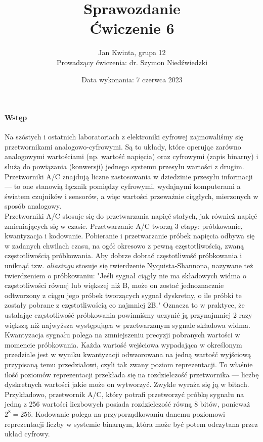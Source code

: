 \documentclass[14pt, table]{extarticle}
\title{\textbf{Sprawozdanie} \\ \Large{Ćwiczenie 6}}
\date{Data wykonania: 7 czerwca 2023}
\author{ \Large{Jan Kwinta, grupa 12} \\ \large{Prowadzący ćwiczenia: dr. Szymon Niedźwiedzki}}
\begin{document}
\maketitle

\paragraph{Wstęp \\}

Na szóstych i ostatnich laboratoriach z elektroniki cyfrowej zajmowaliśmy się przetwornikami analogowo-cyfrowymi. Są to układy, które operując zarówno analogowymi wartościami (np. wartość napięcia) oraz cyfrowymi (zapis binarny) i służą do powiązania (konwersji) jednego systemu przesyłu wartości z drugim. Przetworniki A/C znajdują liczne zastosowania w dziedzinie przesyłu informacji — to one stanowią łącznik pomiędzy cyfrowymi, wydajnymi komputerami a światem czujników i sensorów, a więc wartości przeważnie ciągłych, mierzonych w sposób analogowy. \\

Przetworniki A/C stosuje się do przetwarzania napięć stałych, jak również napięć zmieniających się w czasie. Przetwarzanie A/C tworzą 3 etapy: próbkowanie, kwantyzacja i kodowanie. Pobieranie i przetwarzanie próbek napięcia odbywa się w zadanych chwilach czasu, na ogół okresowo z pewną częstotliwością, zwaną częstotliwością próbkowania. Aby dobrze dobrać częstotliwość próbkowania i uniknąć tzw. \textit{aliasingu} stosuje się twierdzenie Nyquista-Shannona, nazywane też twierdzeniem o próbkowaniu: "Jeśli sygnał ciągły nie ma składowych widma o częstotliwości równej lub większej niż B, może on zostać jednoznacznie odtworzony z ciągu jego próbek tworzących sygnał dyskretny, o ile próbki te zostały pobrane z częstotliwością co najmniej 2B." Oznacza to w praktyce, że ustalając częstotliwość próbkowania powinniśmy uczynić ją przynajmniej 2 razy większą niż najwyższa występująca w przetwarzanym sygnale składowa widma. \\

Kwantyzacja sygnału polega na zmniejszeniu precyzji pobranych wartości w momencie próbkowania. Każda wartość wejściowa wypadająca w określonym przedziale jest w wyniku kwantyzacji odwzorowana na jedną wartość wyjściową przypisaną temu przedziałowi, czyli tak zwany poziom reprezentacji. To właśnie ilość poziomów reprezentacji przekłada się na rozdzielczość przetwornika — liczbę dyskretnych wartości jakie może on wytworzyć. Zwykle wyraża się ją w bitach. Przykładowo, przetwornik A/C, który potrafi przetworzyć próbkę sygnału na jedną z 256 wartości liczbowych posiada rozdzielczość równą 8 bitów, ponieważ $2^{8}=256$. Kodowanie polega na przyporządkowaniu danemu poziomowi reprezentacji liczby w systemie binarnym, która może być potem odczytana przez układ cyfrowy. \\
\end{document}
